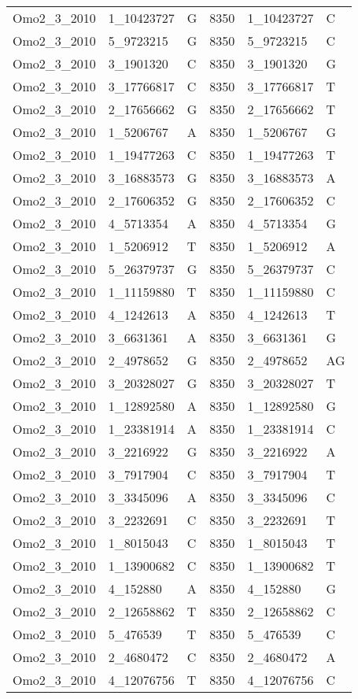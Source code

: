 \begin{center}
\begin{longtable}{|l|l|l|l|l|l|}
Omo2\_3\_2010&1\_10423727&G&8350&1\_10423727&C\\
Omo2\_3\_2010&5\_9723215&G&8350&5\_9723215&C\\
Omo2\_3\_2010&3\_1901320&C&8350&3\_1901320&G\\
Omo2\_3\_2010&3\_17766817&C&8350&3\_17766817&T\\
Omo2\_3\_2010&2\_17656662&G&8350&2\_17656662&T\\
Omo2\_3\_2010&1\_5206767&A&8350&1\_5206767&G\\
Omo2\_3\_2010&1\_19477263&C&8350&1\_19477263&T\\
Omo2\_3\_2010&3\_16883573&G&8350&3\_16883573&A\\
Omo2\_3\_2010&2\_17606352&G&8350&2\_17606352&C\\
Omo2\_3\_2010&4\_5713354&A&8350&4\_5713354&G\\
Omo2\_3\_2010&1\_5206912&T&8350&1\_5206912&A\\
Omo2\_3\_2010&5\_26379737&G&8350&5\_26379737&C\\
Omo2\_3\_2010&1\_11159880&T&8350&1\_11159880&C\\
Omo2\_3\_2010&4\_1242613&A&8350&4\_1242613&T\\
Omo2\_3\_2010&3\_6631361&A&8350&3\_6631361&G\\
Omo2\_3\_2010&2\_4978652&G&8350&2\_4978652&AG\\
Omo2\_3\_2010&3\_20328027&G&8350&3\_20328027&T\\
Omo2\_3\_2010&1\_12892580&A&8350&1\_12892580&G\\
Omo2\_3\_2010&1\_23381914&A&8350&1\_23381914&C\\
Omo2\_3\_2010&3\_2216922&G&8350&3\_2216922&A\\
Omo2\_3\_2010&3\_7917904&C&8350&3\_7917904&T\\
Omo2\_3\_2010&3\_3345096&A&8350&3\_3345096&C\\
Omo2\_3\_2010&3\_2232691&C&8350&3\_2232691&T\\
Omo2\_3\_2010&1\_8015043&C&8350&1\_8015043&T\\
Omo2\_3\_2010&1\_13900682&C&8350&1\_13900682&T\\
Omo2\_3\_2010&4\_152880&A&8350&4\_152880&G\\
Omo2\_3\_2010&2\_12658862&T&8350&2\_12658862&C\\
Omo2\_3\_2010&5\_476539&T&8350&5\_476539&C\\
Omo2\_3\_2010&2\_4680472&C&8350&2\_4680472&A\\
Omo2\_3\_2010&4\_12076756&T&8350&4\_12076756&C\\

\end{longtable}
\end{center}
